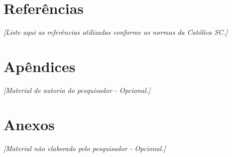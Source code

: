 \documentclass[12pt,a4paper]{article}
\begin{document}
\newpage
\section*{Referências}
\textit{[Liste aqui as referências utilizadas conforme as normas da Católica SC.]}

\newpage
\section*{Apêndices}
\textit{[Material de autoria do pesquisador - Opcional.]}

\newpage
\section*{Anexos}
\textit{[Material não elaborado pelo pesquisador - Opcional.]}
\end{document}
